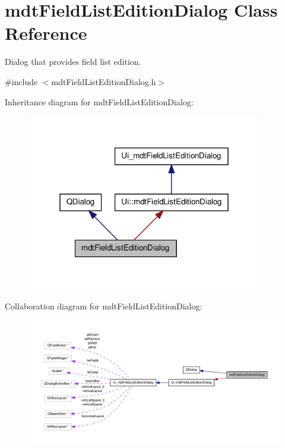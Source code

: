 \hypertarget{classmdt_field_list_edition_dialog}{\section{mdt\-Field\-List\-Edition\-Dialog Class Reference}
\label{classmdt_field_list_edition_dialog}
}


Dialog that provides field list edition.  




{\ttfamily \#include $<$mdt\-Field\-List\-Edition\-Dialog.\-h$>$}



Inheritance diagram for mdt\-Field\-List\-Edition\-Dialog\-:
\nopagebreak
\begin{figure}[H]
\begin{center}
\leavevmode
\includegraphics[width=292pt]{classmdt_field_list_edition_dialog__inherit__graph}
\end{center}
\end{figure}


Collaboration diagram for mdt\-Field\-List\-Edition\-Dialog\-:
\nopagebreak
\begin{figure}[H]
\begin{center}
\leavevmode
\includegraphics[width=350pt]{classmdt_field_list_edition_dialog__coll__graph}
\end{center}
\end{figure}
